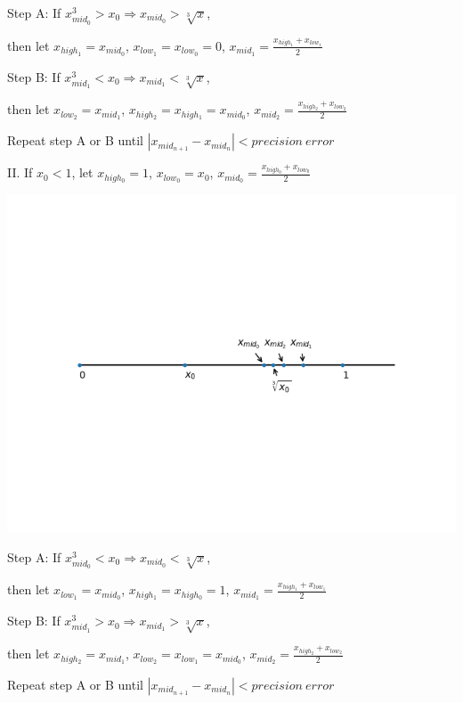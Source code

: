 \documentclass[titlepage]{article}
\begin{document}
Step A: If \(x^3_{mid_0} > x_0 \Rightarrow x_{mid_0} > \sqrt[3]{x}\),

then let \(x_{high_1} = x_{mid_0}\), \(x_{low_1} = x_{low_0} = 0\), \(x_{mid_1} = \frac{x_{high_1} + x_{low_1}}{2}\)

Step B: If \(x^3_{mid_1} < x_0 \Rightarrow x_{mid_1} < \sqrt[3]{x}\),

then let \(x_{low_2} = x_{mid_1}\), \(x_{high_2} = x_{high_1} = x_{mid_0}\), \(x_{mid_2} = \frac{x_{high_2} + x_{low_2}}{2}\)

Repeat step A or B until \(|x_{mid_{n+1}} - x_{mid_n}| < precision~error\)

II. If \(x_0 < 1\), let \(x_{high_0} = 1\), \(x_{low_0} = x_0\), \(x_{mid_0} = \frac{x_{high_0} + x_{low_0}}{2}\)
\begin{center}
\includegraphics[width=.9\linewidth]{numberAxis2.png}
\end{center}

Step A: If \(x^3_{mid_0} < x_0 \Rightarrow x_{mid_0} < \sqrt[3]{x}\),

then let \(x_{low_1} = x_{mid_0}\), \(x_{high_1} = x_{high_0} = 1\), \(x_{mid_1} = \frac{x_{high_1} + x_{low_1}}{2}\)

Step B: If \(x^3_{mid_1} > x_0 \Rightarrow x_{mid_1} > \sqrt[3]{x}\),

then let \(x_{high_2} = x_{mid_1}\), \(x_{low_2} = x_{low_1} = x_{mid_0}\), \(x_{mid_2} = \frac{x_{high_2} + x_{low_2}}{2}\)

Repeat step A or B until \(|x_{mid_{n+1}} - x_{mid_n}| < precision~error\)
\end{document}
